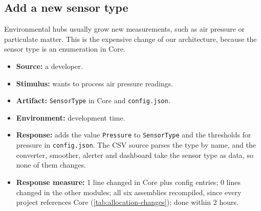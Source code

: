 \documentclass[../main-en.tex]{subfiles}
\begin{document}
\subsection{Add a new sensor type}
\label{sec:scenario-sensor-type}

Environmental hubs usually grow new measurements, such as air pressure or
particulate matter. This is the expensive change of our architecture, because
the sensor type is an enumeration in Core.

\begin{itemize}
  \item \textbf{Source:} a developer.
  \item \textbf{Stimulus:} wants to process air pressure readings.
  \item \textbf{Artifact:} \texttt{SensorType} in Core and
  \texttt{config.json}.
  \item \textbf{Environment:} development time.
  \item \textbf{Response:} adds the value \texttt{Pressure} to
  \texttt{SensorType} and the thresholds for pressure in
  \texttt{config.json}. The CSV source parses the type by name, and the
  converter, smoother, alerter and dashboard take the sensor type as data, so
  none of them changes.
  \item \textbf{Response measure:} 1 line changed in Core plus config
  entries; 0 lines changed in the other modules; all six assemblies
  recompiled, since every project references Core
  (\cref{tab:allocation-changes}); done within 2 hours.
\end{itemize}
\end{document}
